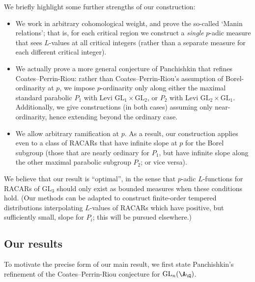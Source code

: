 \documentclass[10pt,reqno,a4paper]{amsart}
\newcommand{\GL}{\mathrm{GL}}
\begin{document}
We briefly highlight some further strengths of our construction:
\begin{itemize}\setlength{\itemsep}{0pt}
	\item[--] We work in arbitrary cohomological weight, and prove the so-called `Manin relations'; that is, for each critical region we construct a \emph{single} $p$-adic measure that sees $L$-values at all critical integers (rather than a separate measure for each different critical integer).

	\item[--] We actually prove a more general conjecture of Panchishkin \cite{Pan94} that refines Coates--Perrin-Riou: rather than Coates--Perrin-Riou's assumption of Borel-ordinarity at $p$, we impose $p$-ordinarity only along either the maximal standard parabolic $P_1$ with Levi $\GL_1 \times \GL_2$, or $P_2$ with Levi $\GL_2\times \GL_1$. Additionally, we give constructions (in both cases) assuming only near-ordinarity, hence extending \cite{Pan94} beyond the ordinary case. 

	\item[--] We allow arbitrary ramification at $p$. As a result, our construction applies even to a class of RACARs that have infinite slope at $p$ for the Borel subgroup (those that are nearly ordinary for $P_1$, but have infinite slope along the other maximal parabolic subgroup $P_2$; or vice versa).
\end{itemize}

We believe that our result is ``optimal'', in the sense that $p$-adic $L$-functions for RACARs of $\GL_3$ should only exist as bounded measures when these conditions hold. (Our methods can be adapted to construct finite-order tempered distributions interpolating $L$-values of RACARs which have positive, but sufficiently small, slope for $P_i$; this will be pursued elsewhere.)

\subsection{Our results}
To motivate the precise form of our main result, we first state Panchishkin's refinement of the Coates--Perrin-Riou conjecture for $\GL_n(\A_{\Q})$.
\end{document}
